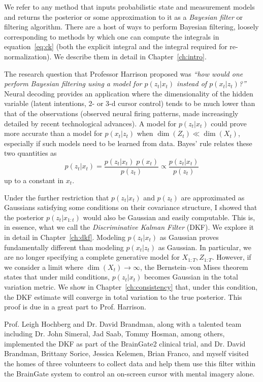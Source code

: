 We refer to any method that inputs probabilistic state and measurement models and returns the posterior or some approximation to it as a \emph{Bayesian filter} or filtering algorithm.  There are a host of ways to perform Bayesian filtering, loosely corresponding to methods by which one can compute the integrals in equation~\ref{eq:ck} (both the explicit integral and the integral required for re-normalization).  We describe them in detail in Chapter~\ref{ch:intro}.  

The research question that Professor Harrison proposed was \emph{``how would one perform Bayesian filtering using a model for $p(z_t|x_t)$ instead of $p(x_t|z_t)$?''} Neural decoding provides an application where the dimensionality of the hidden variable (latent intentions, 2- or 3-d cursor control) tends to be much lower than that of the observations (observed neural firing patterns, made increasingly detailed by recent technological advances).  A model for $p(z_t|x_t)$ could prove more accurate than a model for $p(x_t|z_t)$ when $\dim(Z_t)\ll\dim(X_t)$, especially if such models need to be learned from data.  Bayes' rule relates these two quantities as
\[
p(z_t|x_t) = \frac{p(z_t|x_t)\; p(x_t)}{p(z_t)}
\propto \frac{p(z_t|x_t)}{p(z_t)}
\]
up to a constant in $x_t$.

Under the further restriction that $p(z_t|x_t)$ and $p(z_t)$ are approximated as Gaussians satisfying some conditions on their covariance structure, I showed that the posterior $p(z_t|x_{1:t})$ would also be Gaussian and easily computable.  This is, in essence, what we call the \emph{Discriminative Kalman Filter} (DKF).  We explore it in detail in Chapter~\ref{ch:dkf}.  Modeling $p(z_t|x_t)$ as Gaussian proves fundamentally different than modeling $p(x_t|z_t)$ as Gaussian.  In particular, we are no longer specifying a complete generative model for $X_{1:T},Z_{1:T}$.  However, if we consider a limit where $\dim(X_t)\rightarrow\infty$, the Bernstein--von Mises theorem states that under mild conditions, $p(z_t|x_t)$ becomes Gaussian in the total variation metric.  We show in Chapter~\ref{ch:consistency} that, under this condition, the DKF estimate will converge in total variation to the true posterior.  This proof is due in a great part to Prof. Harrison.

Prof. Leigh Hochberg and Dr. David Brandman, along with a talented team including Dr. John Simeral, Jad Saab, Tommy Hosman, among others, implemented the DKF as part of the BrainGate2 clinical trial, and Dr. David Brandman, Brittany Sorice, Jessica Kelemen, Brian Franco, and myself visited the homes of three volunteers to collect data and help them use this filter within the BrainGate system to control an on-screen cursor with mental imagery alone.

